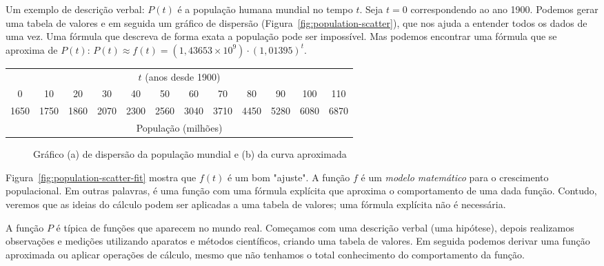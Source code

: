 Um exemplo de descrição verbal: $P(t)$ é a população humana mundial no tempo $t$. Seja $t=0$ correspondendo ao ano 1900. Podemos gerar uma tabela de valores e em seguida um gráfico de dispersão (Figura~\ref{fig:population-scatter}), que nos ajuda a entender todos os dados de uma vez. Uma fórmula que descreva de forma exata a população pode ser impossível. Mas podemos encontrar uma fórmula que se aproxima de $P(t)$: $P(t) \approx f(t) = (1,43653\times 10^9)\cdot(1,01395)^t$.
\vspace{-0.5cm}\begin{table}[!ht]
  \setlength\tabcolsep{0.04cm}
  \begin{tabular}{|cccccccccccc|}\hline
    \multicolumn{12}{|c|}{$t$ (anos desde 1900)}\\
    0&10&20&30&40&50&60&70&80&90&100&110\\
    1650&1750&1860&2070&2300&2560&3040&3710&4450&5280&6080&6870\\
    \multicolumn{12}{|c|}{População (milhões)}\\\hline
  \end{tabular}\vspace{-1cm}
\end{table}%
\begin{figure}[!ht]
  \centering
  \caption{Gráfico (a) de dispersão da população mundial e (b) da curva aproximada}\vspace{-0.3cm}
\end{figure}

Figura~\ref{fig:population-scatter-fit} mostra que $f(t)$ é um bom "ajuste". A função $f$ é um \emph{modelo matemático} para o crescimento populacional. Em outras palavras, é uma função com uma fórmula explícita que aproxima o comportamento de uma dada função. Contudo, veremos que as ideias do cálculo podem ser aplicadas a uma tabela de valores; uma fórmula explícita não é necessária.


A função $P$ é típica de funções que aparecem no mundo real. Começamos com uma descrição verbal (uma hipótese), depois realizamos observações e medições utilizando aparatos e métodos científicos, criando uma tabela de valores. Em seguida podemos derivar uma função aproximada ou aplicar operações de cálculo, mesmo que não tenhamos o total conhecimento do comportamento da função.

